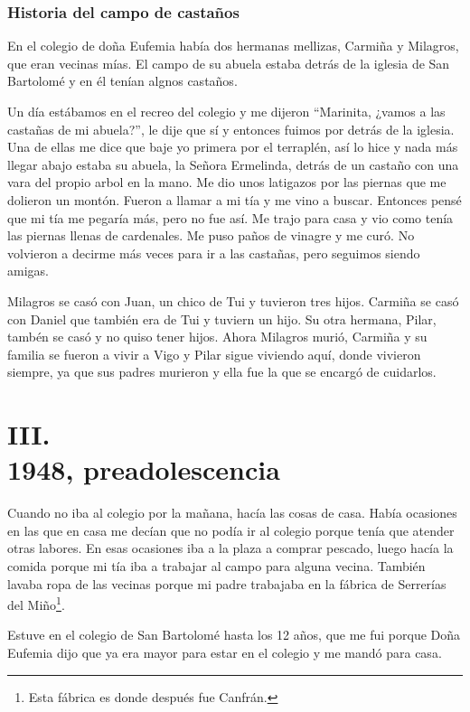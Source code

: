 \documentclass[12pt,a5paper]{book}
\begin{document}
\subsubsection*{Historia del campo de castaños}

En el colegio de doña Eufemia había dos hermanas mellizas, Carmiña y Milagros, que eran vecinas mías. El campo de su abuela estaba detrás de la iglesia de San Bartolomé y en él tenían algnos castaños. 

Un día estábamos en el recreo del colegio y me dijeron ``Marinita, ¿vamos a las castañas de mi abuela?'', le dije que sí y entonces fuimos por detrás de la iglesia. Una de ellas me dice que baje yo primera por el terraplén, así lo hice y nada más llegar abajo estaba su abuela, la Señora Ermelinda, detrás de un castaño con una vara del propio arbol en la mano. Me dio unos latigazos por las piernas que me dolieron un montón. Fueron a llamar a mi tía y me vino a buscar. Entonces pensé que mi tía me pegaría más, pero no fue así. Me trajo para casa y vio como tenía las piernas llenas de cardenales. Me puso paños de vinagre y me curó. No volvieron a decirme más veces para ir a las castañas, pero seguimos siendo amigas. 

Milagros se casó con Juan, un chico de Tui y tuvieron tres hijos. Carmiña se casó con Daniel que también era de Tui y tuviern un hijo. Su otra hermana, Pilar, tambén se casó y no quiso tener hijos. Ahora Milagros murió, Carmiña y su familia se fueron a vivir a Vigo y Pilar sigue viviendo aquí, donde vivieron siempre, ya que sus padres murieron y ella fue la que se encargó de cuidarlos.



\section*{III.\\1948, preadolescencia}

Cuando no iba al colegio por la mañana, hacía las cosas de casa. Había ocasiones en las que en casa me decían que no podía ir al colegio porque tenía que atender otras labores. En esas ocasiones iba a la plaza a comprar pescado, luego hacía la comida porque mi tía iba a trabajar al campo para alguna vecina. También lavaba ropa de las vecinas porque mi padre trabajaba en la fábrica de Serrerías del Miño\footnote{Esta fábrica es donde después fue Canfrán.}. 

Estuve en el colegio de San Bartolomé hasta los 12 años, que me fui porque Doña Eufemia dijo que ya era mayor para estar en el colegio y me mandó para casa.
\end{document}
